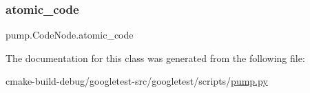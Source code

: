 \subsubsection{\texorpdfstring{atomic\_code}{atomic\_code}}
{\footnotesize\ttfamily pump.\+Code\+Node.\+atomic\+\_\+code}



The documentation for this class was generated from the following file\+:\begin{DoxyCompactItemize}
\item 
cmake-\/build-\/debug/googletest-\/src/googletest/scripts/\mbox{\hyperlink{pump_8py}{pump.\+py}}\end{DoxyCompactItemize}
